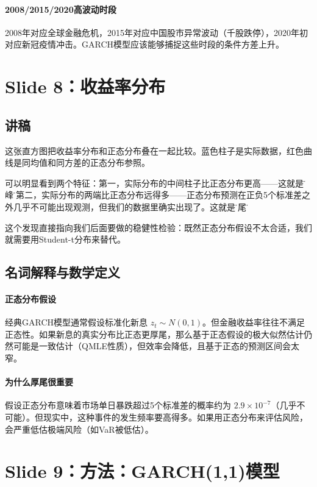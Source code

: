 \documentclass[11pt,a4paper]{article}
\begin{document}
\paragraph{2008/2015/2020高波动时段} 2008年对应全球金融危机，2015年对应中国股市异常波动（千股跌停），2020年初对应新冠疫情冲击。GARCH模型应该能够捕捉这些时段的条件方差上升。

\newpage
\section*{Slide 8：收益率分布}

\subsection*{讲稿}
这张直方图把收益率分布和正态分布叠在一起比较。蓝色柱子是实际数据，红色曲线是同均值和同方差的正态分布参照。

可以明显看到两个特征：第一，实际分布的中间柱子比正态分布更高——这就是\"尖峰\"。第二，实际分布的两端比正态分布远得多——正态分布预测在正负5个标准差之外几乎不可能出现观测，但我们的数据里确实出现了。这就是\"厚尾\"。

这个发现直接指向我们后面要做的稳健性检验：既然正态分布假设不太合适，我们就需要用Student-t分布来替代。

\subsection*{名词解释与数学定义}

\paragraph{正态分布假设} 经典GARCH模型通常假设标准化新息 \(z_t \sim N(0,1)\)。但金融收益率往往不满足正态性。如果新息的真实分布比正态更厚尾，那么基于正态假设的极大似然估计仍然可能是一致估计（QMLE性质），但效率会降低，且基于正态的预测区间会太窄。

\paragraph{为什么厚尾很重要} 假设正态分布意味着市场单日暴跌超过5个标准差的概率约为 \(2.9 \times 10^{-7}\)（几乎不可能）。但现实中，这种事件的发生频率要高得多。如果用正态分布来评估风险，会严重低估极端风险（如VaR被低估）。

\newpage
\section*{Slide 9：方法：GARCH(1,1)模型}
\end{document}
